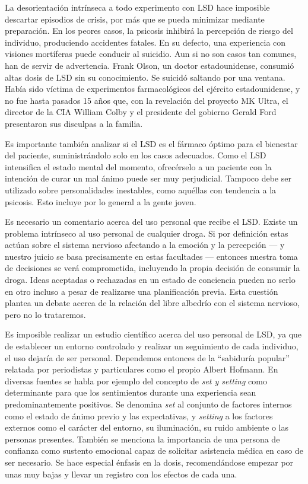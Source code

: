 La desorientación intrínseca a todo experimento con LSD hace imposible descartar episodios de crisis, por más que se pueda minimizar mediante preparación. En los peores casos, la psicosis inhibirá la percepción de riesgo del individuo, produciendo accidentes fatales. En su defecto, una experiencia con visiones mortíferas puede conducir al suicidio. Aun si no son casos tan comunes, han de servir de advertencia. Frank Olson, un doctor estadounidense, consumió altas dosis de LSD sin su conocimiento. Se suicidó saltando por una ventana. Había sido víctima de experimentos farmacológicos del ejército estadounidense, y no fue hasta pasados 15 años que, con la revelación del proyecto MK Ultra, el director de la CIA William Colby y el presidente del gobierno Gerald Ford presentaron sus disculpas a la familia.

Es importante también analizar si el LSD es el fármaco óptimo para el bienestar del paciente, suministrándolo solo en los casos adecuados. Como el LSD intensifica el estado mental del momento, ofrecérselo a un paciente con la intención de curar un mal ánimo puede ser muy perjudicial. Tampoco debe ser utilizado sobre personalidades inestables, como aquéllas con tendencia a la psicosis. Esto incluye por lo general a la gente joven.

Es necesario un comentario acerca del uso personal que recibe el LSD. Existe un problema intrínseco al uso personal de cualquier droga. Si por definición estas actúan sobre el sistema nervioso afectando a la emoción y la percepción --- y nuestro juicio se basa precisamente en estas facultades --- entonces nuestra toma de decisiones se verá comprometida, incluyendo la propia decisión de consumir la droga. Ideas aceptadas o rechazadas en un estado de conciencia pueden no serlo en otro incluso a pesar de realizarse una planificación previa. Esta cuestión plantea un debate acerca de la relación del libre albedrío con el sistema nervioso, pero no lo trataremos.

Es imposible realizar un estudio científico acerca del uso personal de LSD, ya que de establecer un entorno controlado y realizar un seguimiento de cada individuo, el uso dejaría de ser personal. Dependemos entonces de la \enquote{sabiduría popular} relatada por periodistas y particulares como el propio Albert Hofmann. En diversas fuentes se habla por ejemplo del concepto de \textit{set y setting} como determinante para que los sentimientos durante una experiencia sean predominantemente positivos. Se denomina \textit{set} al conjunto de factores internos como el estado de ánimo previo y las expectativas, y \textit{setting} a los factores externos como el carácter del entorno, su iluminación, su ruido ambiente o las personas presentes. También se menciona la importancia de una persona de confianza como sustento emocional capaz de solicitar asistencia médica en caso de ser necesario. Se hace especial énfasis en la dosis, recomendándose empezar por unas muy bajas y llevar un registro con los efectos de cada una.

